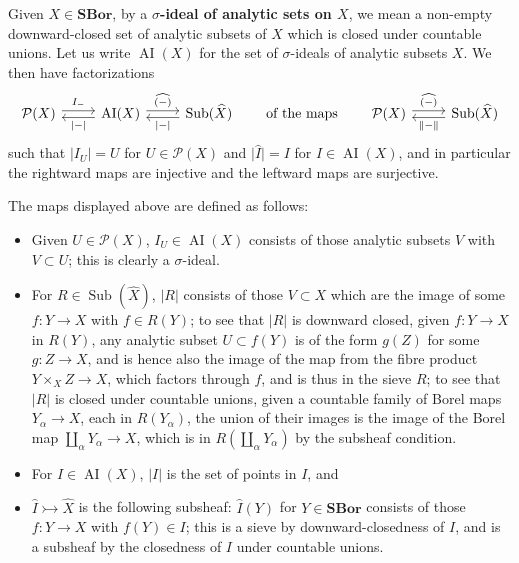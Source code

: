 \documentclass[11pt]{amsart}
\newcommand\abs[2][]{#1\lvert{#2}#1\rvert}
\newcommand\AI{\operatorname{AI}}
\newcommand\defword[1]{\textbf{#1}}
\newcommand\norm[2][]{#1\lVert{#2}#1\rVert}
\newcommand\pow{\mathcal{P}}
\newcommand\SBor{\mathbf{SBor}}
\newcommand\Sub{\operatorname{Sub}}
\newcommand\tto{\rightarrowtail}
\newcommand\wh[1]{\widehat{#1}}
\theoremstyle{definition}
\theoremstyle{remark}
\theoremstyle{plain}
\begin{document}
Given \( X \in \SBor \), by a \defword{\( \sigma \)-ideal of analytic sets on \( X \)}, we mean a non-empty downward-closed set of analytic subsets of \( X \) which is closed under countable unions.
Let us write \( \AI(X) \) for the set of \( \sigma \)-ideals of analytic subsets \( X \).
We then have factorizations
\begin{equation}\label{eq:subsheaf-factorization}
  \begin{tikzcd}
    \pow(X) \ar[r, "I_{-}", shift left] &
    \AI(X) \ar[r, shift left, "\wh{(-)}"] \ar[l, shift left, "\abs{-}"] &
    \Sub(\wh X) \ar[l, "\abs{-}", shift left]
  \end{tikzcd}
  \qquad\text{of the maps}\qquad
  \begin{tikzcd}
    \pow(X) \ar[r, "\wh{(-)}", shift left] &
    \Sub(\wh X) \ar[l, "\norm{-}", shift left]
  \end{tikzcd}
\end{equation}
such that \( \abs{I_U} = U \) for \( U \in \pow(X) \) and \( \abs{\wh I} = I \) for \( I \in \AI(X) \), and in particular the rightward maps are injective and the leftward maps are surjective.

The maps displayed above are defined as follows:
\begin{itemize}
\item Given \( U \in \pow(X) \), \( I_U \in \AI(X) \) consists of those analytic subsets \( V \) with \( V \subset U \); this is clearly a \( \sigma \)-ideal.
\item For \( R \in \Sub(\wh X) \), \( \abs{R} \) consists of those \( V \subset X \) which are the image of some \( f \colon Y \to X \) with \( f \in R (Y) \); to see that \( \abs{R} \) is downward closed, given \( f \colon Y \to X \) in \( R(Y) \), any analytic subset \( U \subset f(Y) \) is of the form \( g(Z) \) for some \( g \colon Z \to X \), and is hence also the image of the map from the fibre product \( Y \times_X Z \to X \), which factors through \( f \), and is thus in the sieve \( R \); to see that \( \abs{R} \) is closed under countable unions, given a countable family of Borel maps \( Y_\alpha \to X \), each in \( R(Y_\alpha) \), the union of their images is the image of the Borel map \( \coprod_{\alpha} Y_\alpha \to X \), which is in \( R(\coprod_{\alpha} Y_\alpha) \) by the subsheaf condition.
\item For \( I \in \AI(X) \), \( \abs{I} \) is the set of points in \( I \), and
\item \( \wh I \tto \wh X \) is the following subsheaf: \( \wh I(Y) \) for \( Y \in \SBor \) consists of those \( f \colon Y \to X \) with \( f(Y) \in I \); this is a sieve by downward-closedness of \( I \), and is a subsheaf by the closedness of \( I \) under countable unions.
\end{itemize}
\end{document}
